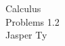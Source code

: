 \documentclass{article}
\begin{document}
\begin{mytitle}
    Calculus \\
    Problems 1.2 \\
    \normalsize Jasper Ty
\end{mytitle}

\begin{Answer}
\end{Answer}
\end{document}
